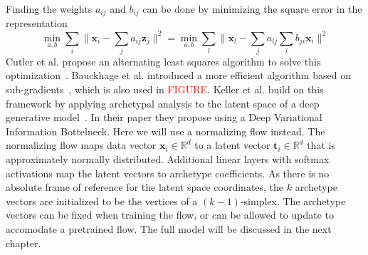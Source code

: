 Finding the weights $a_{ij}$ and $b_{ij}$ can be done by minimizing the square
error in the representation
\begin{equation}
        \label{eq:archetype_rss}
        \min_{a,b} \sum_i \lVert \mathbf{x}_i - \sum_j a_{ij} \mathbf{z}_j
        \rVert^2
        = \min_{a,b} \sum_l \lVert \mathbf{x}_l - \sum_j a_{lj} \sum_i
        b_{ji} \mathbf{x}_i \rVert^2
\end{equation}
Cutler et al. propose an alternating least squares
algorithm to solve this optimization~\citep{cutlerArchetypalAnalysis1994}.
Bauckhage et al. introduced a more efficient algorithm based on
sub-gradients~\citep{bauckhageArchetypalAnalysisAutoencoder2015}, which is also
used in \textcolor{red}{FIGURE}. %
Keller et al. build on this framework by applying archetypal analysis to the
latent space of a deep generative
model~\citep{kellerLearningExtremalRepresentations2020}. In their paper they
propose using a Deep Variational Information Bottelneck. Here we will use a
normalizing flow instead. The normalizing flow maps data vector $\mathbf{x}_i
\in \mathbb{R}^d$ to a latent vector $\mathbf{t}_i \in \mathbb{R}^d$ that is
approximately normally distributed. Additional linear layers with softmax
activations map the latent vectors to archetype coefficients. As there is no
absolute frame of reference for the latent space coordinates, the $k$ archetype
vectors are initialized to be the vertices of a $(k-1)$-simplex. The archetype
vectors can be fixed when training the flow, or can be allowed to update to
accomodate a pretrained flow. The full model will be discussed in the next
chapter.

